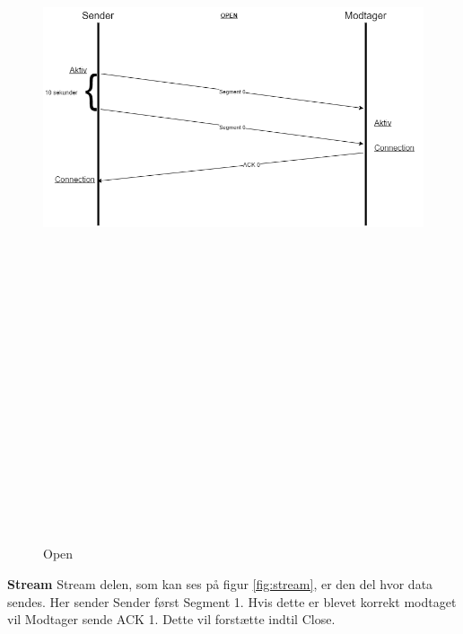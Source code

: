 \begin{figure}[ht]
	\centering
	\includegraphics[width=15cm,height=25cm,keepaspectratio]{pictures/Open.png}
	\caption{Open}
	\label{fig:open}
\end{figure}

\hfill \break
\textbf{Stream}
\newline
Stream delen, som kan ses på figur \ref{fig:stream}, er den del hvor data sendes.
\newline
Her sender Sender først Segment 1. Hvis dette er blevet korrekt modtaget vil Modtager sende ACK 1.
Dette vil forstætte indtil Close. 

